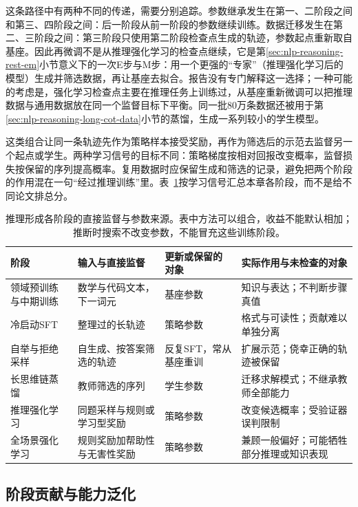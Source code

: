 这条路径中有两种不同的传递，需要分别追踪。参数继承发生在第一、二阶段之间和第三、四阶段之间：后一阶段从前一阶段的参数继续训练。数据迁移发生在第二、三阶段之间：第三阶段只使用第二阶段检查点生成的轨迹，参数起点重新取自基座。因此再微调不是从推理强化学习的检查点继续，它是第\ref{sec:nlp-reasoning-rest-em}小节意义下的一次E步与M步：用一个更强的“专家”（推理强化学习后的模型）生成并筛选数据，再让基座去拟合。报告没有专门解释这一选择；一种可能的考虑是，强化学习检查点主要在推理任务上训练过，从基座重新微调可以把推理数据与通用数据放在同一个监督目标下平衡。同一批80万条数据还被用于第\ref{sec:nlp-reasoning-long-cot-data}小节的蒸馏，生成一系列较小的学生模型。

这类组合让同一条轨迹先作为策略样本接受奖励，再作为筛选后的示范去监督另一个起点或学生。两种学习信号的目标不同：策略梯度按相对回报改变概率，监督损失按保留的序列提高概率。复用数据时应保留生成和筛选的记录，避免把两个阶段的作用混在一句“经过推理训练”里。表~\ref{tab:nlp-reasoning-learning-signals}按学习信号汇总本章各阶段，而不是给不同论文排总分。

\begin{table}[htbp]
  \centering
  \small
  \caption{推理形成各阶段的直接监督与参数来源。表中方法可以组合，收益不能默认相加；推断时搜索不改变参数，不能冒充这些训练阶段。}
  \label{tab:nlp-reasoning-learning-signals}
  \begin{tabularx}{\linewidth}{@{}p{24mm}p{38mm}p{36mm}X@{}}
    \toprule
    阶段 & 输入与直接监督 & 更新或保留的对象 & 实际作用与未检查的对象\\
    \midrule
    领域预训练与中期训练 & 数学与代码文本，下一词元 & 基座参数 & 知识与表达；不判断步骤真值\\
    冷启动SFT & 整理过的长轨迹 & 策略参数 & 格式与可读性；贡献难以单独分离\\
    自举与拒绝采样 & 自生成、按答案筛选的轨迹 & 反复SFT，常从基座重训 & 扩展示范；侥幸正确的轨迹被保留\\
    长思维链蒸馏 & 教师筛选的序列 & 学生参数 & 迁移求解模式；不继承教师全部能力\\
    推理强化学习 & 同题采样与规则或学习型奖励 & 策略参数 & 改变候选概率；受验证器误判限制\\
    全场景强化学习 & 规则奖励加帮助性与无害性奖励 & 策略参数 & 兼顾一般偏好；可能牺牲部分推理或知识表现\\
    \bottomrule
  \end{tabularx}
\end{table}

\subsection{阶段贡献与能力泛化}
\label{sec:nlp-reasoning-attribution}

